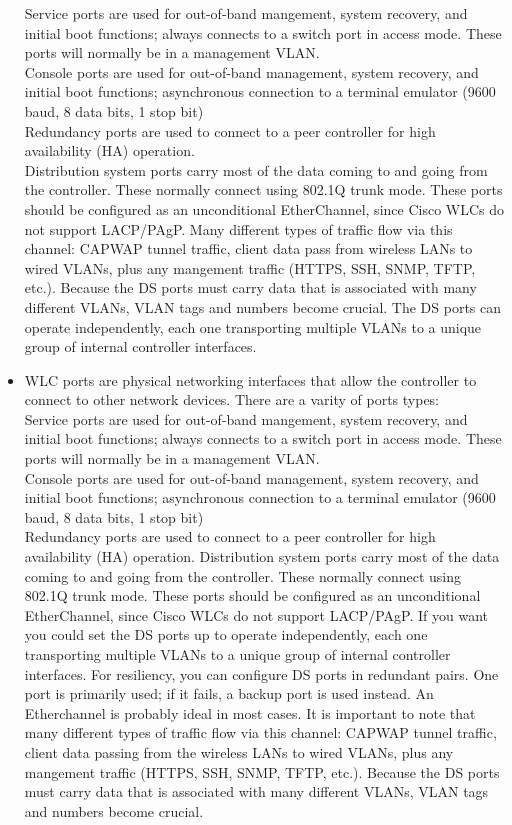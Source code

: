 \documentclass{article}
\begin{document}
\begin{itemize}
		Service ports are used for out-of-band mangement, system recovery, and initial boot functions; always connects to a switch port in access mode. These ports will normally be in a management VLAN.\\
		
		Console ports are used for out-of-band management, system recovery, and initial boot functions; asynchronous connection to a terminal emulator (9600 baud, 8 data bits, 1 stop bit)\\
		
		Redundancy ports are used to connect to a peer controller for high availability (HA) operation.\\
		
		Distribution system ports carry most of the data coming to and going from the controller. These normally connect using 802.1Q trunk mode. These ports should be configured as an unconditional EtherChannel, since Cisco WLCs do not support LACP/PAgP. Many different types of traffic flow via this channel: CAPWAP tunnel traffic, client data pass from wireless LANs to wired VLANs, plus any mangement traffic (HTTPS, SSH, SNMP, TFTP, etc.). Because the DS ports must carry data that is associated with many different VLANs, VLAN tags and numbers become crucial. The DS ports can operate independently, each one transporting multiple VLANs to a unique group of internal controller interfaces.		
  	\item[] WLC ports are physical networking interfaces that allow the controller to connect to other network devices. There are a varity of ports types:\\
		Service ports are used for out-of-band mangement, system recovery, and initial boot functions; always connects to a switch port in access mode. These ports will normally be in a management VLAN.\\
		Console ports are used for out-of-band management, system recovery, and initial boot functions; asynchronous connection to a terminal emulator (9600 baud, 8 data bits, 1 stop bit)\\
		Redundancy ports are used to connect to a peer controller for high availability (HA) operation.
		Distribution system ports carry most of the data coming to and going from the controller. These normally connect using 802.1Q trunk mode. These ports should be configured as an unconditional EtherChannel, since Cisco WLCs do not support LACP/PAgP. If you want you could set the DS ports up to operate independently, each one transporting multiple VLANs to a unique group of internal controller interfaces. For resiliency, you can configure DS ports in redundant pairs. One port is primarily used; if it fails, a backup port is used instead. An Etherchannel is probably ideal in most cases. It is important to note that many different types of traffic flow via this channel: CAPWAP tunnel traffic, client data passing from the wireless LANs to wired VLANs, plus any mangement traffic (HTTPS, SSH, SNMP, TFTP, etc.). Because the DS ports must carry data that is associated with many different VLANs, VLAN tags and numbers become crucial.

\end{itemize}
\end{document}
